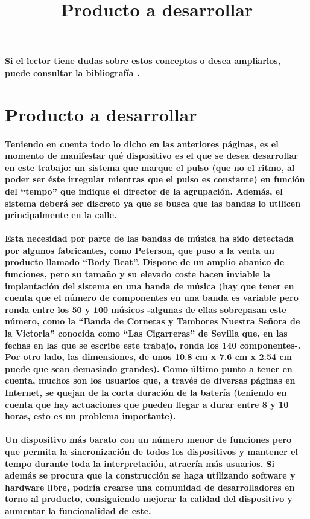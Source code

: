 \paragraph{
Si el lector tiene dudas sobre estos conceptos o desea ampliarlos, puede consultar la bibliografía \cite{teorMusica} \cite{lenguajeMusical}.
}

\title{Producto a desarrollar}
\section{Producto a desarrollar}

\paragraph{
Teniendo en cuenta todo lo dicho en las anteriores páginas, es el momento de manifestar qué dispositivo es el que se desea desarrollar en este trabajo: un sistema que marque el pulso (que no el ritmo, al poder ser éste irregular mientras que el pulso es constante) en función del “tempo” que indique el director de la agrupación. Además, el sistema deberá ser discreto ya que se busca que las bandas lo utilicen principalmente en la calle.
}

\paragraph{
Esta necesidad por parte de las bandas de música ha sido detectada por algunos fabricantes, como Peterson, que puso a la venta un producto llamado “Body Beat”. Dispone de un amplio abanico de funciones, pero su tamaño y su elevado coste hacen inviable la implantación del sistema en una banda de música (hay que tener en cuenta que el número de componentes en una banda es variable pero ronda entre los 50 y 100 músicos -algunas de ellas sobrepasan este número, como la “Banda de Cornetas y Tambores Nuestra Señora de la Victoria” conocida como “Las Cigarreras” de Sevilla \cite{cigarreras} que, en las fechas en las que se escribe este trabajo, ronda los 140 componentes-. Por otro lado, las dimensiones, de unos 10.8 cm x 7.6 cm x 2.54 cm puede que sean demasiado grandes). Como último punto a tener en cuenta, muchos son los usuarios que, a través de diversas páginas en Internet, se quejan de la corta duración de la batería (teniendo en cuenta que hay actuaciones que pueden llegar a durar entre 8 y 10 horas, esto es un problema importante).
}

\paragraph{
Un dispositivo más barato con un número menor de funciones pero que permita la sincronización de todos los dispositivos y mantener el tempo durante toda la interpretación, atraería más usuarios. Si además se procura que la construcción se haga utilizando software y hardware libre, podría crearse una comunidad de desarrolladores en torno al producto, consiguiendo mejorar la calidad del dispositivo y aumentar la funcionalidad de este.
}

